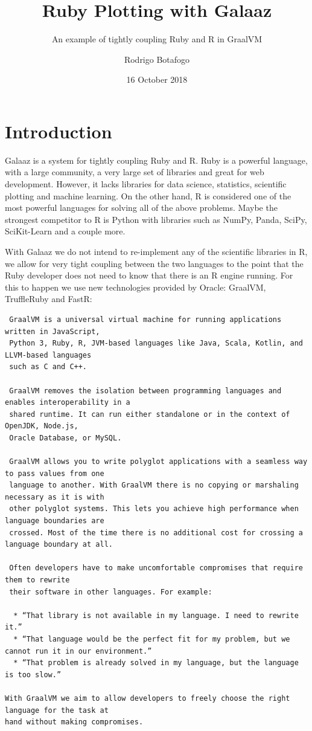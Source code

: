 \documentclass[]{article}
\title{Ruby Plotting with Galaaz}
\subtitle{An example of tightly coupling Ruby and R in GraalVM}
\author{Rodrigo Botafogo}
\date{16 October 2018}
\begin{document}
\maketitle

\section{Introduction}\label{introduction}

Galaaz is a system for tightly coupling Ruby and R. Ruby is a powerful
language, with a large community, a very large set of libraries and
great for web development. However, it lacks libraries for data science,
statistics, scientific plotting and machine learning. On the other hand,
R is considered one of the most powerful languages for solving all of
the above problems. Maybe the strongest competitor to R is Python with
libraries such as NumPy, Panda, SciPy, SciKit-Learn and a couple more.

With Galaaz we do not intend to re-implement any of the scientific
libraries in R, we allow for very tight coupling between the two
languages to the point that the Ruby developer does not need to know
that there is an R engine running. For this to happen we use new
technologies provided by Oracle: GraalVM, TruffleRuby and FastR:

\begin{verbatim}
 GraalVM is a universal virtual machine for running applications written in JavaScript,
 Python 3, Ruby, R, JVM-based languages like Java, Scala, Kotlin, and LLVM-based languages
 such as C and C++.

 GraalVM removes the isolation between programming languages and enables interoperability in a
 shared runtime. It can run either standalone or in the context of OpenJDK, Node.js,
 Oracle Database, or MySQL.

 GraalVM allows you to write polyglot applications with a seamless way to pass values from one
 language to another. With GraalVM there is no copying or marshaling necessary as it is with
 other polyglot systems. This lets you achieve high performance when language boundaries are
 crossed. Most of the time there is no additional cost for crossing a language boundary at all.

 Often developers have to make uncomfortable compromises that require them to rewrite
 their software in other languages. For example:

  * “That library is not available in my language. I need to rewrite it.” 
  * “That language would be the perfect fit for my problem, but we cannot run it in our environment.” 
  * “That problem is already solved in my language, but the language is too slow.”

With GraalVM we aim to allow developers to freely choose the right language for the task at
hand without making compromises.
\end{verbatim}
\end{document}
